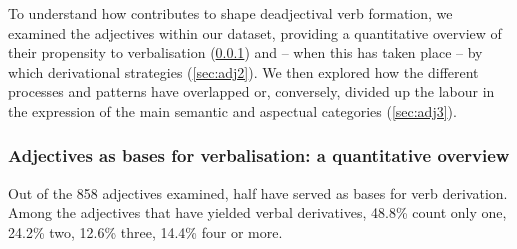 \documentclass[output=paper,colorlinks,citecolor=brown]{langscibook}
\begin{document}
To understand how  contributes to shape deadjectival verb formation, we examined the adjectives within our dataset, providing a quantitative overview of their propensity to verbalisation (\ref{sec:adj1}) and -- when this has taken place -- by which derivational strategies (\ref{sec:adj2}). We then explored how the different processes and patterns have overlapped or, conversely, divided up the labour in the expression of the main semantic and aspectual categories (\ref{sec:adj3}).

\subsubsection{Adjectives as bases for verbalisation: a quantitative overview}
\label{sec:adj1}

Out of the 858 adjectives examined, half have served as bases for verb derivation. Among the adjectives that have yielded verbal derivatives, 48.8\% count only one, 24.2\% two, 12.6\% three, 14.4\% four or more.
\end{document}
